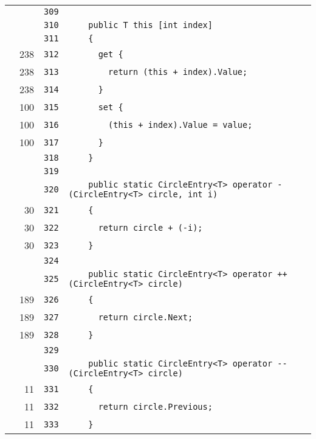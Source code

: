 \documentclass[a4paper,10pt]{article}
\begin{document}
\begin{longtable}[l]{lrrl}
\cellcolor{gray} &  & \verb~309~ & \verb~~\\
\cellcolor{gray} &  & \verb~310~ & \verb~    public T this [int index]~\\
\cellcolor{gray} &  & \verb~311~ & \verb~    {~\\
\cellcolor{green} & 238 & \verb~312~ & \verb~      get {~\\
\cellcolor{green} & 238 & \verb~313~ & \verb~        return (this + index).Value;~\\
\cellcolor{green} & 238 & \verb~314~ & \verb~      }~\\
\cellcolor{green} & 100 & \verb~315~ & \verb~      set {~\\
\cellcolor{green} & 100 & \verb~316~ & \verb~        (this + index).Value = value;~\\
\cellcolor{green} & 100 & \verb~317~ & \verb~      }~\\
\cellcolor{gray} &  & \verb~318~ & \verb~    }~\\
\cellcolor{gray} &  & \verb~319~ & \verb~~\\
\cellcolor{gray} &  & \verb~320~ & \verb~    public static CircleEntry<T> operator - (CircleEntry<T> circle, int i)~\\
\cellcolor{green} & 30 & \verb~321~ & \verb~    {~\\
\cellcolor{green} & 30 & \verb~322~ & \verb~      return circle + (-i);~\\
\cellcolor{green} & 30 & \verb~323~ & \verb~    }~\\
\cellcolor{gray} &  & \verb~324~ & \verb~~\\
\cellcolor{gray} &  & \verb~325~ & \verb~    public static CircleEntry<T> operator ++ (CircleEntry<T> circle)~\\
\cellcolor{green} & 189 & \verb~326~ & \verb~    {~\\
\cellcolor{green} & 189 & \verb~327~ & \verb~      return circle.Next;~\\
\cellcolor{green} & 189 & \verb~328~ & \verb~    }~\\
\cellcolor{gray} &  & \verb~329~ & \verb~~\\
\cellcolor{gray} &  & \verb~330~ & \verb~    public static CircleEntry<T> operator -- (CircleEntry<T> circle)~\\
\cellcolor{green} & 11 & \verb~331~ & \verb~    {~\\
\cellcolor{green} & 11 & \verb~332~ & \verb~      return circle.Previous;~\\
\cellcolor{green} & 11 & \verb~333~ & \verb~    }~\\

\end{longtable}
\end{document}

